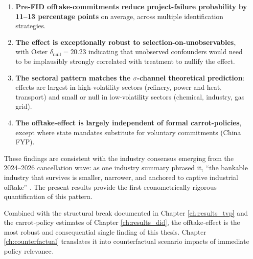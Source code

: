 \begin{enumerate}
\item \textbf{Pre-FID offtake-commitments reduce project-failure probability by 11--13 percentage points} on average, across multiple identification strategies.

\item \textbf{The effect is exceptionally robust to selection-on-unobservables}, with Oster $\delta_{\text{null}} = 20.23$ indicating that unobserved confounders would need to be implausibly strongly correlated with treatment to nullify the effect.

\item \textbf{The sectoral pattern matches the $\sigma$-channel theoretical prediction}: effects are largest in high-volatility sectors (refinery, power and heat, transport) and small or null in low-volatility sectors (chemical, industry, gas grid).

\item \textbf{The offtake-effect is largely independent of formal carrot-policies}, except where state mandates substitute for voluntary commitments (China FYP).
\end{enumerate}

These findings are consistent with the industry consensus emerging from the 2024--2026 cancellation wave: as one industry summary phrased it, ``the bankable industry that survives is smaller, narrower, and anchored to captive industrial offtake'' \cite{decarbonizeweekly2026}. The present results provide the first econometrically rigorous quantification of this pattern.

Combined with the structural break documented in Chapter \ref{ch:results_tvp} and the carrot-policy estimates of Chapter \ref{ch:results_did}, the offtake-effect is the most robust and consequential single finding of this thesis. Chapter \ref{ch:counterfactual} translates it into counterfactual scenario impacts of immediate policy relevance.
